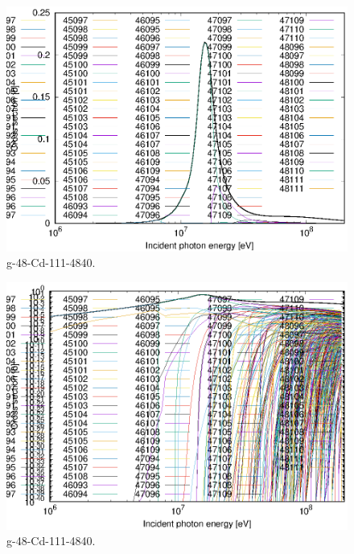 \begin{figure}
 \includegraphics[width=\linewidth]{eps/g_48-Cd-111_4840.eps}
  \caption{g-48-Cd-111-4840.}
\end{figure}
\begin{figure}
 \includegraphics[width=\linewidth]{eps-log/g_48-Cd-111_4840.eps}
 \caption{g-48-Cd-111-4840.}
\end{figure}
\newpage \clearpage

